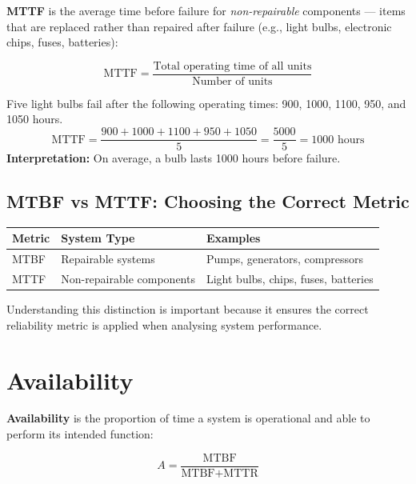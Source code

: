 \documentclass[12pt,a4paper]{article}
\begin{document}
\textbf{MTTF} is the average time before failure for \emph{non-repairable} components --- items that are replaced rather than repaired after failure (e.g., light bulbs, electronic chips, fuses, batteries):

\begin{equation}
\text{MTTF} = \frac{\text{Total operating time of all units}}{\text{Number of units}}
\end{equation}

\begin{example}
Five light bulbs fail after the following operating times: 900, 1000, 1100, 950, and 1050 hours.
\[
\text{MTTF} = \frac{900 + 1000 + 1100 + 950 + 1050}{5} = \frac{5000}{5} = 1000 \text{ hours}
\]
\textbf{Interpretation:} On average, a bulb lasts 1000 hours before failure.
\end{example}

\subsection*{MTBF vs MTTF: Choosing the Correct Metric}

\begin{center}
\renewcommand{\arraystretch}{1.4}
\begin{tabular}{|l|l|l|}
\hline
\textbf{Metric} & \textbf{System Type} & \textbf{Examples} \\
\hline
MTBF & Repairable systems & Pumps, generators, compressors \\
MTTF & Non-repairable components & Light bulbs, chips, fuses, batteries \\
\hline
\end{tabular}
\end{center}

Understanding this distinction is important because it ensures the correct reliability metric is applied when analysing system performance.

\section{Availability}

\textbf{Availability} is the proportion of time a system is operational and able to perform its intended function:

\begin{equation}
A = \frac{\text{MTBF}}{\text{MTBF} + \text{MTTR}}
\end{equation}
\end{document}

